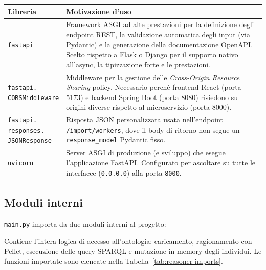 \documentclass[a4paper,12pt]{article}
\renewcommand{\paragraph}[1]{%
  \par\vspace{4pt}%
  \noindent{\bfseries #1}\par\vspace{2pt}%
  \noindent\ignorespaces
}
\begin{document}
\begin{longtable}{L{3.5cm} L{9cm}}
  \toprule
  \textbf{Libreria} & \textbf{Motivazione d'uso} \\
  \midrule
  \endhead
  \texttt{fastapi} & Framework ASGI ad alte prestazioni per la definizione
                    degli endpoint REST, la validazione automatica degli input
                    (via Pydantic) e la generazione della documentazione
                    OpenAPI. Scelto rispetto a Flask o Django per il
                    supporto nativo all'async, la tipizzazione forte e le
                    prestazioni. \\[4pt]
  \texttt{fastapi.\newline CORSMiddleware} & Middleware per la gestione delle
                    \textit{Cross-Origin Resource Sharing} policy.
                    Necessario perch\'{e} frontend React (porta 5173) e backend
                    Spring Boot (porta 8080) risiedono su origini diverse
                    rispetto al microservizio (porta 8000). \\[4pt]
  \texttt{fastapi.\newline responses.\newline JSONResponse} & Risposta JSON personalizzata
                    usata nell'endpoint \texttt{/import/workers}, dove il
                    body di ritorno non segue un \texttt{response\_model}
                    Pydantic fisso. \\[4pt]
  \texttt{uvicorn} & Server ASGI di produzione (e sviluppo) che esegue
                    l'applicazione FastAPI. Configurato per ascoltare su
                    tutte le interfacce (\texttt{0.0.0.0}) alla porta
                    \texttt{8000}. \\
  \bottomrule
\end{longtable}

\noindent \subsection{Moduli interni}

\texttt{main.py} importa da due moduli interni al progetto:

\paragraph{\texttt{reasoner}} Contiene l'intera logica di accesso
all'ontologia: caricamento, ragionamento con Pellet, esecuzione delle
query SPARQL e mutazione in-memory degli individui. Le funzioni importate
sono elencate nella Tabella~\ref{tab:reasoner-imports}.
\end{document}
